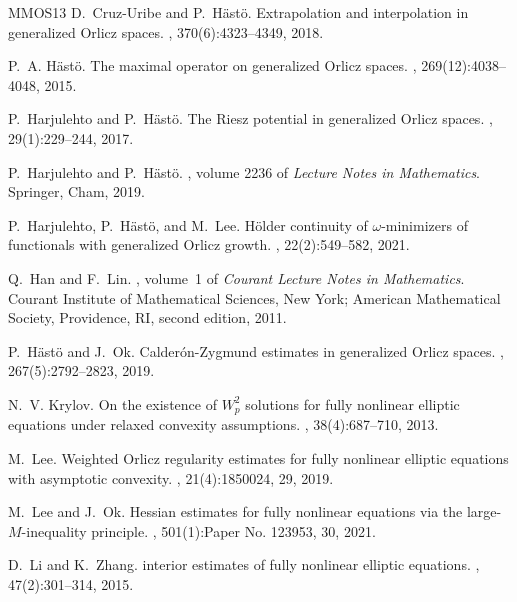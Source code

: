 \documentclass[11pt, reqno]{amsart}
\numberwithin{equation}{section}
\begin{document}
\begin{thebibliography}{MMOS13}
D.~Cruz-Uribe and P.~H\"{a}st\"{o}.
\newblock Extrapolation and interpolation in generalized {O}rlicz spaces.
, 370(6):4323--4349, 2018.

P.~A. H\"{a}st\"{o}.
\newblock The maximal operator on generalized {O}rlicz spaces.
, 269(12):4038--4048, 2015.

P.~Harjulehto and P.~H\"{a}st\"{o}.
\newblock The {R}iesz potential in generalized {O}rlicz spaces.
, 29(1):229--244, 2017.

P.~Harjulehto and P.~H\"{a}st\"{o}.
, volume 2236 of
  {\em Lecture Notes in Mathematics}.
\newblock Springer, Cham, 2019.

P.~Harjulehto, P.~H\"ast\"o, and M.~Lee.
\newblock H\"older continuity of {$\omega$}-minimizers of functionals with
  generalized {O}rlicz growth.
, 22(2):549--582, 2021.

Q.~Han and F.~Lin.
, volume~1 of {\em
  Courant Lecture Notes in Mathematics}.
\newblock Courant Institute of Mathematical Sciences, New York; American
  Mathematical Society, Providence, RI, second edition, 2011.

P.~H\"{a}st\"{o} and J.~Ok.
\newblock Calder\'{o}n-{Z}ygmund estimates in generalized {O}rlicz spaces.
, 267(5):2792--2823, 2019.

N.~V. Krylov.
\newblock On the existence of {$W_p^2$} solutions for fully nonlinear elliptic
  equations under relaxed convexity assumptions.
, 38(4):687--710, 2013.

M.~Lee.
\newblock Weighted {O}rlicz regularity estimates for fully nonlinear elliptic
  equations with asymptotic convexity.
, 21(4):1850024, 29, 2019.

M.~Lee and J.~Ok.
\newblock Hessian estimates for fully nonlinear equations via the
  large-{$M$}-inequality principle.
, 501(1):Paper No. 123953, 30, 2021.

D.~Li and K.~Zhang.
 interior estimates of fully nonlinear elliptic equations.
, 47(2):301--314, 2015.


\end{thebibliography}
\end{document}

